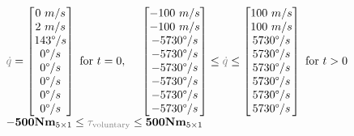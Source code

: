 \documentclass[10pt,letterpaper]{article}
\begin{document}
{{\begin{equation}
\begin{array}{ll@{}ll}
            & \textcolor{gray}{\dot{q}} = \left[ \begin{matrix} 0~m/s\\ 2~m/s\\ 143\degree/s\\ 0\degree/s\\ 0\degree/s\\ 0\degree/s\\ 0\degree/s\\ 0\degree/s \end{matrix} \right]~\text{for}~t = 0, ~~~~ \left[ \begin{matrix} -100~m/s\\ -100~m/s\\ -5730\degree/s\\ -5730\degree/s\\ -5730\degree/s\\ -5730\degree/s\\ -5730\degree/s\\ -5730\degree/s \end{matrix} \right] \leq \textcolor{gray}{\dot{q}} \leq \left[ \begin{matrix} 100~m/s\\ 100~m/s\\ 5730\degree/s\\ 5730\degree/s\\ 5730\degree/s\\ 5730\degree/s\\ 5730\degree/s\\ 5730\degree/s \end{matrix} \right]~\text{for}~t > 0 \\
            &  \mathbf{-500Nm}_{5\times1} \leq \textcolor{gray}{\tau_{\text{voluntary}}} \leq \mathbf{500Nm}_{5\times1} \\

\end{array}
\end{equation}}}
\end{document}
